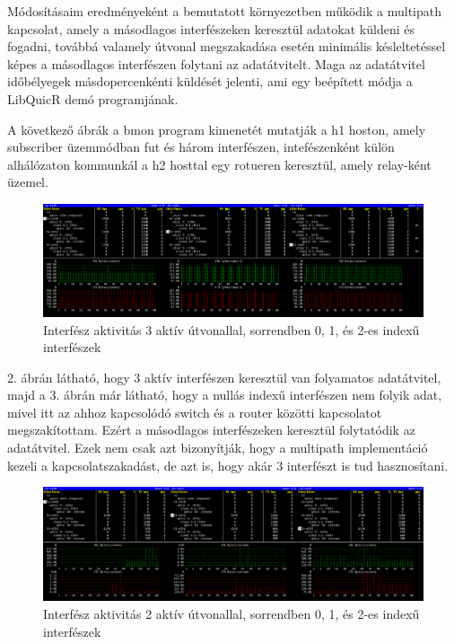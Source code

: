 \documentclass[a4paper,oneside]{article}
\begin{document}
Módosításaim eredményeként a bemutatott környezetben működik a multipath
kapcsolat, amely a másodlagos interfészeken keresztül adatokat küldeni és fogadni, továbbá valamely útvonal megszakadása esetén
minimális késleltetéssel képes a másodlagos interfészen folytani az adatátvitelt.
Maga az adatátvitel időbélyegek másdopercenkénti küldését jelenti, ami egy beépített módja a LibQuicR demó programjának.

A következő ábrák a bmon program kimenetét mutatják a h1 hoston, amely subscriber üzemmódban fut és három interfészen, intefészenként
külön alhálózaton kommunkál a h2 hosttal egy rotueren keresztül, amely relay-ként üzemel.

\begin{figure}[h]
  \centering
    \hspace*{-1.5cm}%
    \includegraphics[width=18cm]{bmon1}
\caption{Interfész aktivitás 3 aktív útvonallal, sorrendben 0, 1, és 2-es indexű interfészek}
\end{figure}

2. ábrán látható, hogy 3 aktív interfészen keresztül van folyamatos adatátvitel, majd a 3. ábrán 
már látható, hogy a nullás indexű interfészen nem folyik adat, mivel itt az ahhoz kapcsolódó switch és a router közötti kapcsolatot megszakítottam.
Ezért a másodlagos interfészeken keresztül folytatódik az adatátvitel. Ezek nem csak azt bizonyítják, hogy a multipath 
implementáció kezeli a kapcsolatszakadást, de azt is, hogy akár 3 interfészt is tud hasznosítani.


\begin{figure}[h]
  \centering
    \hspace*{-1.5cm}%
    \includegraphics[width=18cm]{bmon2}
\caption{Interfész aktivitás 2 aktív útvonallal, sorrendben 0, 1, és 2-es indexű interfészek}
\end{figure}
\end{document}
